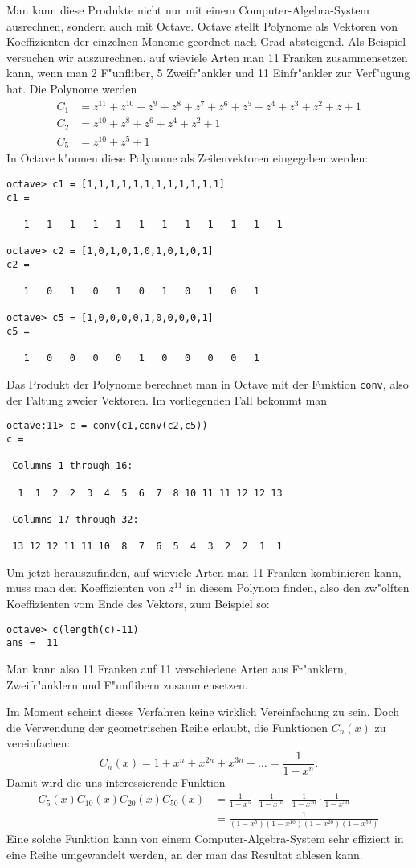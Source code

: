 Man kann diese Produkte nicht nur mit einem Computer-Algebra-System
ausrechnen, sondern auch mit Octave. Octave stellt Polynome als
Vektoren von Koeffizienten der einzelnen Monome geordnet nach Grad
absteigend. Als Beispiel versuchen wir auszurechnen, auf wieviele
Arten man 11 Franken zusammensetzen kann, wenn man 2 F"unfliber,
5 Zweifr"ankler und 11 Einfr"ankler zur Verf"ugung hat. Die
Polynome werden
\begin{align*}
C_1&=z^{11}+z^{10}+z^9+z^8+z^7+z^6+z^5+z^4+z^3+z^2+z+1\\
C_2&=z^{10}+z^8+z^6+z^4+z^2+1\\
C_5&=z^{10}+z^5+1
\end{align*}
In Octave k"onnen diese Polynome als Zeilenvektoren eingegeben werden:
\begin{verbatim}
octave> c1 = [1,1,1,1,1,1,1,1,1,1,1,1]
c1 =

   1   1   1   1   1   1   1   1   1   1   1   1

octave> c2 = [1,0,1,0,1,0,1,0,1,0,1]
c2 =

   1   0   1   0   1   0   1   0   1   0   1

octave> c5 = [1,0,0,0,0,1,0,0,0,0,1]
c5 =

   1   0   0   0   0   1   0   0   0   0   1
\end{verbatim}
Das Produkt der Polynome berechnet man in Octave mit der Funktion
{\tt conv}, also der Faltung zweier Vektoren. Im vorliegenden Fall
bekommt man
\begin{verbatim}
octave:11> c = conv(c1,conv(c2,c5))
c =

 Columns 1 through 16:

  1  1  2  2  3  4  5  6  7  8 10 11 11 12 12 13

 Columns 17 through 32:

 13 12 12 11 11 10  8  7  6  5  4  3  2  2  1  1
\end{verbatim}
Um jetzt herauszufinden, auf wieviele Arten man 11 Franken
kombinieren kann, muss man den Koeffizienten von $z^{11}$ in diesem
Polynom finden, also den zw"olften Koeffizienten vom Ende des
Vektors, zum Beispiel so:
\begin{verbatim}
octave> c(length(c)-11)
ans =  11
\end{verbatim}
Man kann also 11 Franken auf 11 verschiedene Arten aus Fr"anklern,
Zweifr"anklern und F"unflibern zusammensetzen.

Im Moment scheint dieses Verfahren keine wirklich Vereinfachung
zu sein. Doch die Verwendung der geometrischen Reihe erlaubt, die
Funktionen $C_n(x)$ zu vereinfachen:
\[
C_n(x)=1+x^n+x^{2n}+x^{3n}+\dots = \frac1{1-x^n}.
\]
Damit wird die uns interessierende Funktion
\begin{align*}
C_5(x) C_{10}(x) C_{20}(x) C_{50}(x)
&=
\frac1{1-x^5}\cdot
\frac1{1-x^{10}}\cdot
\frac1{1-x^{20}}\cdot
\frac1{1-x^{50}}
\\
&=
\frac1{
(1-x^5)
(1-x^{10})
(1-x^{20})
(1-x^{50})
}
\end{align*}
Eine solche Funktion kann von einem Computer-Algebra-System sehr effizient
in eine Reihe umgewandelt werden, an der man das Resultat ablesen kann.

